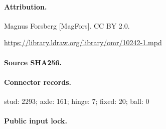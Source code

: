 \paragraph{Attribution.}Magnus Forsberg [MagFors]. CC BY 2.0.\par\url{https://library.ldraw.org/library/omr/10242-1.mpd}
\paragraph{Source SHA256.}
\paragraph{Connector records.}stud: 2293; axle: 161; hinge: 7; fixed: 20; ball: 0
\paragraph{Public input lock.}
